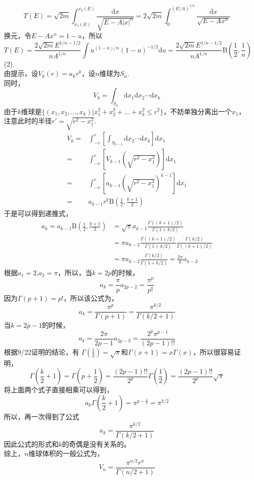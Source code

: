\documentclass[11pt,a4paper,openany]{article}
\begin{document}
\[
T(E)=\sqrt{2m}\int^{x_2 (E)}_{x_1 (E)}\frac{\mathrm{d}x}{\sqrt{E-A|x|^n}}
=2\sqrt{2m}\int^{(E/A)^{1/n}}_{0}\frac{\mathrm{d}x}{\sqrt{E-Ax^n}}\]
换元，令$E-Ax^n=1-u$，所以
\[
T(E)=\frac{2\sqrt{2m}E^{1/n-1/2}}{nA^{1/n}}\int u^{(1-n)/n}(1-u)^{-1/2}\mathrm{d}u
=\frac{2\sqrt{2m}E^{1/n-1/2}}{nA^{1/n}}\text{B}\left(\frac{1}{2},\frac{1}{n}\right)
\]
(2).\\ \indent 由提示，设$V_k (r)=a_k r^k $，设$n$维球为$S_n$.\\同时，
\[V_k=
\int_{S_k} 
\mathrm{d}x_1 \mathrm{d}x_2 \cdots \mathrm{d}x_k
\]
由于$k$维球是$\{(x_1,x_2,\dots,x_k)|x_1^2+x_2^2+\dots+x_k^2 \leq r^2\}$，不妨单独分离出一个$x_1$，注意此时的半径$r'=\sqrt{r^2-x_1^2}$.
\[
\begin{split}
V_k=&
\int^r_{-r} \left[\int_{S_{k-1}} 
\mathrm{d}x_2 \cdots \mathrm{d}x_k \right]\mathrm{d}x_1\\
=&\int^r_{-r} \left[V_{k-1}\left(\sqrt{r^2-x^2_1}\right)\right]\mathrm{d}x_1\\
=&\int^r_{-r} \left[a_{k-1}\left(\sqrt{r^2-x^2_1}\right)^{k-1}\right]\mathrm{d}x_1\\
=&a_{k-1}r^k \text{B}\left(\frac{1}{2},\frac{k+1}{2} \right)
\end{split}
\]
于是可以得到递推式，
\[
\begin{split}
a_k=a_{k-1}\text{B}\left(\frac{1}{2},\frac{k+1}{2} \right)
&=\sqrt{\pi}a_{k-1}\frac{\Gamma((k+1)/2)}{\Gamma(1+k/2)}\\
&=\pi a_{k-2}
\frac{\Gamma((k+1)/2)}{\Gamma(1+k/2)}
\frac{\Gamma(k/2)}{\Gamma((k+1)/2)}\\
&=\pi a_{k-2}
\frac{\Gamma(k/2)}{\Gamma(1+k/2)}
=\frac{2\pi}{k} a_{k-2}
\end{split}
\]
根据$a_1=2$,$a_2=\pi$，所以，当$k=2p$的时候，
\[
a_k
=\frac{\pi}{p} a_{2p-2}
=\frac{\pi^{p}}{p!}
\]
因为$\Gamma(p+1)=p!$，所以该公式为，
\[
a_k
=\frac{\pi^{p}}{\Gamma(p+1)}
=\frac{\pi^{k/2}}{\Gamma(k/2+1)}
\]
当$k=2p-1$的时候，
\[
a_k
=\frac{2\pi}{2p-1} a_{2p-3}
=\frac{2^{p} \pi^{p-1}}{(2p-1)!!}
\]
根据9/22证明的结论，有
$\displaystyle{\Gamma\left(\frac{1}{2}\right)=\sqrt{\pi}}$和$\displaystyle{\Gamma\left(x+1\right)=x\Gamma\left(x\right)}$，所以很容易证明，
\[
\Gamma\left(\frac{k}{2}+1\right)
=\Gamma\left(p+\frac{1}{2}\right)=\frac{(2p-1)!!}{2^p}\Gamma\left(\frac{1}{2}\right)
=\frac{(2p-1)!!}{2^{p}}\sqrt{\pi}
\]
将上面两个式子直接相乘可以得到，
\[
a_k\Gamma\left(\frac{k}{2}+1\right)
=\pi^{p-\frac{1}{2}}
=\pi^{k/2}
\]
所以，再一次得到了公式
\[
a_k
=\frac{\pi^{k/2}}{\Gamma(k/2+1)}
\]
因此公式的形式和$k$的奇偶是没有关系的。\\
\indent 综上，$n$维球体积的一般公式为，
\[
V_n
=\frac{\pi^{n/2}r^n }{\Gamma(n/2+1)}
\]
\end{document}
